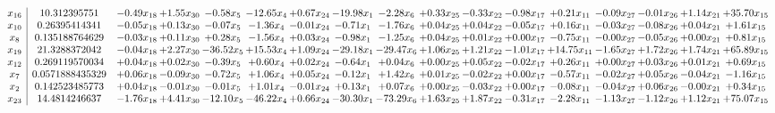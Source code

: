 \documentclass[9pt]{article}
\begin{document}
 \[\begin{array}{c| c c@{\hskip 2pt} c@{\hskip 2pt} c@{\hskip 2pt} c@{\hskip 2pt} c@{\hskip 2pt} c@{\hskip 2pt} c@{\hskip 2pt} c@{\hskip 2pt} c@{\hskip 2pt} c@{\hskip 2pt} c@{\hskip 2pt} c@{\hskip 2pt} c@{\hskip 2pt} c@{\hskip 2pt} c@{\hskip 2pt} }
 x_{16}   &  10.312395751 & -0.49 x_{18} & +  1.55 x_{30} & -0.58 x_{5} & -12.65 x_{4} & +  0.67 x_{24} & -19.98 x_{1} & -2.28 x_{6} & +  0.33 x_{25} & -0.33 x_{22} & -0.98 x_{17} & +  0.21 x_{11} & -0.09 x_{27} & -0.01 x_{26} & +  1.14 x_{21} & + 35.70 x_{15}\\
 x_{10}   &  0.26395414341 & -0.05 x_{18} & +  0.13 x_{30} & -0.07 x_{5} & -1.36 x_{4} & -0.01 x_{24} & -0.71 x_{1} & -1.76 x_{6} & +  0.04 x_{25} & +  0.04 x_{22} & -0.05 x_{17} & +  0.16 x_{11} & -0.03 x_{27} & -0.08 x_{26} & +  0.04 x_{21} & +  1.61 x_{15}\\
 x_{8}   &  0.135188764629 & -0.03 x_{18} & +  0.11 x_{30} & +  0.28 x_{5} & -1.56 x_{4} & +  0.03 x_{24} & -0.98 x_{1} & -1.25 x_{6} & +  0.04 x_{25} & +  0.01 x_{22} & +  0.00 x_{17} & -0.75 x_{11} & -0.00 x_{27} & -0.05 x_{26} & +  0.00 x_{21} & +  0.81 x_{15}\\
 x_{19}   &  21.3288372042 & -0.04 x_{18} & +  2.27 x_{30} & -36.52 x_{5} & + 15.53 x_{4} & +  1.09 x_{24} & -29.18 x_{1} & -29.47 x_{6} & +  1.06 x_{25} & +  1.21 x_{22} & -1.01 x_{17} & + 14.75 x_{11} & -1.65 x_{27} & +  1.72 x_{26} & +  1.74 x_{21} & + 65.89 x_{15}\\
 x_{12}   &  0.269119570034 & +  0.04 x_{18} & +  0.02 x_{30} & -0.39 x_{5} & +  0.60 x_{4} & +  0.02 x_{24} & -0.64 x_{1} & +  0.04 x_{6} & +  0.00 x_{25} & +  0.05 x_{22} & -0.02 x_{17} & +  0.26 x_{11} & +  0.00 x_{27} & +  0.03 x_{26} & +  0.01 x_{21} & +  0.69 x_{15}\\
 x_{7}   &  0.0571888435329 & +  0.06 x_{18} & -0.09 x_{30} & -0.72 x_{5} & +  1.06 x_{4} & +  0.05 x_{24} & -0.12 x_{1} & +  1.42 x_{6} & +  0.01 x_{25} & -0.02 x_{22} & +  0.00 x_{17} & -0.57 x_{11} & -0.02 x_{27} & +  0.05 x_{26} & -0.04 x_{21} & -1.16 x_{15}\\
 x_{2}   &  0.142523485773 & +  0.04 x_{18} & -0.01 x_{30} & -0.01 x_{5} & +  1.01 x_{4} & -0.01 x_{24} & +  0.13 x_{1} & +  0.07 x_{6} & +  0.00 x_{25} & -0.03 x_{22} & +  0.00 x_{17} & -0.08 x_{11} & -0.04 x_{27} & +  0.06 x_{26} & -0.00 x_{21} & +  0.34 x_{15}\\
 x_{23}   &  14.4814246637 & -1.76 x_{18} & +  4.41 x_{30} & -12.10 x_{5} & -46.22 x_{4} & +  0.66 x_{24} & -30.30 x_{1} & -73.29 x_{6} & +  1.63 x_{25} & +  1.87 x_{22} & -0.31 x_{17} & -2.28 x_{11} & -1.13 x_{27} & -1.12 x_{26} & +  1.12 x_{21} & + 75.07 x_{15}\\

\end{array}\]
\end{document}
